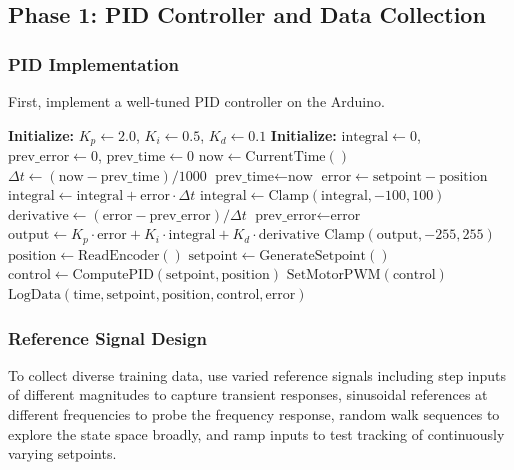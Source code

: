 \subsection{Phase 1: PID Controller and Data Collection}

\subsubsection{PID Implementation}

First, implement a well-tuned PID controller on the Arduino.

\begin{algorithm}[htbp]
\caption{PID Controller for Data Collection}
\label{alg:pid_data_collection}
\begin{algorithmic}[1]
\State \textbf{Initialize:} $K_p \gets 2.0$, $K_i \gets 0.5$, $K_d \gets 0.1$
\State \textbf{Initialize:} $\text{integral} \gets 0$, $\text{prev\_error} \gets 0$, $\text{prev\_time} \gets 0$
    \State $\text{now} \gets \text{CurrentTime}()$
    \State $\Delta t \gets (\text{now} - \text{prev\_time}) / 1000$
    \State $\text{prev\_time} \gets \text{now}$
    \State $\text{error} \gets \text{setpoint} - \text{position}$
    \State $\text{integral} \gets \text{integral} + \text{error} \cdot \Delta t$
    \State $\text{integral} \gets \text{Clamp}(\text{integral}, -100, 100)$ 
    \State $\text{derivative} \gets (\text{error} - \text{prev\_error}) / \Delta t$
    \State $\text{prev\_error} \gets \text{error}$
    \State $\text{output} \gets K_p \cdot \text{error} + K_i \cdot \text{integral} + K_d \cdot \text{derivative}$
    \State \Return $\text{Clamp}(\text{output}, -255, 255)$
\EndFunction
\Loop
    \State $\text{position} \gets \text{ReadEncoder}()$
    \State $\text{setpoint} \gets \text{GenerateSetpoint}()$
    \State $\text{control} \gets \text{ComputePID}(\text{setpoint}, \text{position})$
    \State $\text{SetMotorPWM}(\text{control})$
    \State $\text{LogData}(\text{time}, \text{setpoint}, \text{position}, \text{control}, \text{error})$
\EndLoop
\end{algorithmic}
\end{algorithm}

\subsubsection{Reference Signal Design}

To collect diverse training data, use varied reference signals including step inputs of different magnitudes to capture transient responses, sinusoidal references at different frequencies to probe the frequency response, random walk sequences to explore the state space broadly, and ramp inputs to test tracking of continuously varying setpoints.

